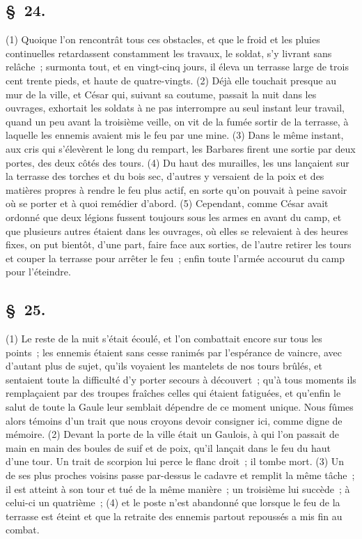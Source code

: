 \documentclass[french,twoside]{book} %
\begin{document}
\subsection[{§ 24.}]{ \textsc{§ 24.} }
\noindent (1) Quoique l’on rencontrât tous ces obstacles, et que le froid et les pluies continuelles retardassent constamment les travaux, le soldat, s’y livrant sans relâche ; surmonta tout, et en vingt-cinq jours, il éleva un terrasse large de trois cent trente pieds, et haute de quatre-vingts. (2) Déjà elle touchait presque au mur de la ville, et César qui, suivant sa coutume, passait la nuit dans les ouvrages, exhortait les soldats à ne pas interrompre au seul instant leur travail, quand un peu avant la troisième veille, on vit de la fumée sortir de la terrasse, à laquelle les ennemis avaient mis le feu par une mine. (3) Dans le même instant, aux cris qui s’élevèrent le long du rempart, les Barbares firent une sortie par deux portes, des deux côtés des tours. (4) Du haut des murailles, les uns lançaient sur la terrasse des torches et du bois sec, d’autres y versaient de la poix et des matières propres à rendre le feu plus actif, en sorte qu’on pouvait à peine savoir où se porter et à quoi remédier d’abord. (5) Cependant, comme César avait ordonné que deux légions fussent toujours sous les armes en avant du camp, et que plusieurs autres étaient dans les ouvrages, où elles se relevaient à des heures fixes, on put bientôt, d’une part, faire face aux sorties, de l’autre retirer les tours et couper la terrasse pour arrêter le feu ; enfin toute l’armée accourut du camp pour l’éteindre.
\subsection[{§ 25.}]{ \textsc{§ 25.} }
\noindent (1) Le reste de la nuit s’était écoulé, et l’on combattait encore sur tous les points ; les ennemis étaient sans cesse ranimés par l’espérance de vaincre, avec d’autant plus de sujet, qu’ils voyaient les mantelets de nos tours brûlés, et sentaient toute la difficulté d’y porter secours à découvert ; qu’à tous moments ils remplaçaient par des troupes fraîches celles qui étaient fatiguées, et qu’enfin le salut de toute la Gaule leur semblait dépendre de ce moment unique. Nous fûmes alors témoins d’un trait que nous croyons devoir consigner ici, comme digne de mémoire. (2) Devant la porte de la ville était un Gaulois, à qui l’on passait de main en main des boules de suif et de poix, qu’il lançait dans le feu du haut d’une tour. Un trait de scorpion lui perce le flanc droit ; il tombe mort. (3) Un de ses plus proches voisins passe par-dessus le cadavre et remplit la même tâche ; il est atteint à son tour et tué de la même manière ; un troisième lui succède ; à celui-ci un quatrième ; (4) et le poste n’est abandonné que lorsque le feu de la terrasse est éteint et que la retraite des ennemis partout repoussés a mis fin au combat.
\end{document}
